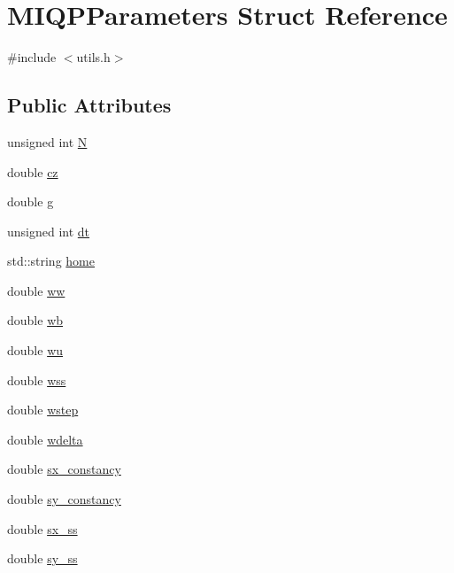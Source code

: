 \hypertarget{structMIQPParameters}{\section{\-M\-I\-Q\-P\-Parameters \-Struct \-Reference}
\label{structMIQPParameters}
}


{\ttfamily \#include $<$utils.\-h$>$}

\subsection*{\-Public \-Attributes}
\begin{DoxyCompactItemize}
\item 
unsigned int \hyperlink{structMIQPParameters_a7545bc29708292cbfca22b0446180f7c}{\-N}
\item 
double \hyperlink{structMIQPParameters_ab8158e2bf119d70c9856b6a277e3c42a}{cz}
\item 
double \hyperlink{structMIQPParameters_a31eca71d200b5b1468bd60b3266d0688}{g}
\item 
unsigned int \hyperlink{structMIQPParameters_ab4fca30503423e047dc55d27f0c9f3c9}{dt}
\item 
std\-::string \hyperlink{structMIQPParameters_a351843e2933021d2ed3abb00a9d001ff}{home}
\item 
double \hyperlink{structMIQPParameters_a7223a1cda1e4565d18729f1e7bba87e0}{ww}
\item 
double \hyperlink{structMIQPParameters_a6bc828e6060bfd69c3d6353a460de86b}{wb}
\item 
double \hyperlink{structMIQPParameters_aed141afdcc25904d53526a5f2c977427}{wu}
\item 
double \hyperlink{structMIQPParameters_a317395e51ff98506316b9a63cf03d48f}{wss}
\item 
double \hyperlink{structMIQPParameters_a284df9b565513a826e92098f0a23f5cc}{wstep}
\item 
double \hyperlink{structMIQPParameters_ac13ff21321154d5cebba21855ac8357f}{wdelta}
\item 
double \hyperlink{structMIQPParameters_ae7f08901a6a4bd6850cf232496d1c231}{sx\-\_\-constancy}
\item 
double \hyperlink{structMIQPParameters_a1dd5e07b3f05ddf30ecbe878caf4de38}{sy\-\_\-constancy}
\item 
double \hyperlink{structMIQPParameters_af8a016a12ecffd0751307c7d869472e9}{sx\-\_\-ss}
\item 
double \hyperlink{structMIQPParameters_a3c473019e93f8191f288edfe6999f4c1}{sy\-\_\-ss}

\end{DoxyCompactItemize}
